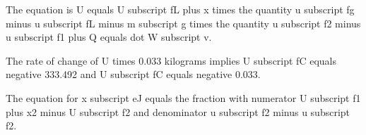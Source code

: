 The equation is U equals U subscript fL plus x times the quantity u subscript fg minus u subscript fL minus m subscript g times the quantity u subscript f2 minus u subscript f1 plus Q equals dot W subscript v.

The rate of change of U times 0.033 kilograms implies U subscript fC equals negative 333.492 and U subscript fC equals negative 0.033.

The equation for x subscript eJ equals the fraction with numerator U subscript f1 plus x2 minus U subscript f2 and denominator u subscript f2 minus u subscript f2.